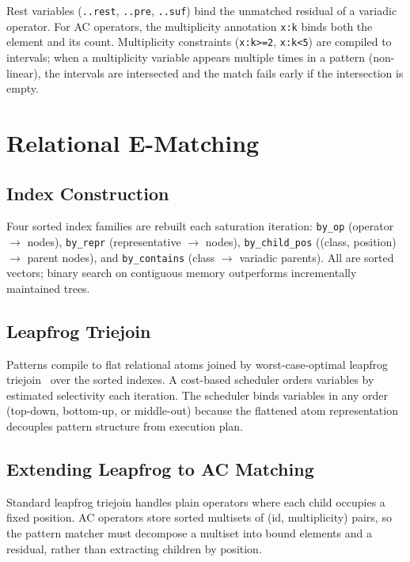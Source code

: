 \documentclass[sigplan,nonacm]{acmart}
\begin{document}
Rest variables (\texttt{..rest}, \texttt{..pre}, \texttt{..suf})
bind the unmatched residual of a variadic operator.  For AC
operators, the multiplicity annotation \texttt{x:k} binds both the
element and its count.  Multiplicity constraints (\texttt{x:k>=2},
\texttt{x:k<5}) are compiled to intervals; when a multiplicity
variable appears multiple times in a pattern (non-linear), the
intervals are intersected and the match fails early if the
intersection is empty.


\section{Relational E-Matching}

\subsection{Index Construction}

Four sorted index families are rebuilt each saturation iteration:
\texttt{by\_op} (operator $\to$ nodes), \texttt{by\_repr}
(representative $\to$ nodes), \texttt{by\_child\_pos} ((class,
position) $\to$ parent nodes), and \texttt{by\_contains} (class
$\to$ variadic parents).  All are sorted vectors; binary search on
contiguous memory outperforms incrementally maintained trees.

\subsection{Leapfrog Triejoin}

Patterns compile to flat relational atoms joined by worst-case-optimal
leapfrog triejoin~\cite{veldhuizen} over the sorted indexes.  A
cost-based scheduler orders variables by estimated selectivity each
iteration.  The scheduler binds variables in any order (top-down,
bottom-up, or middle-out) because the flattened atom representation
decouples pattern structure from execution plan.

\subsection{Extending Leapfrog to AC Matching}

Standard leapfrog triejoin handles plain operators where each child
occupies a fixed position.  AC operators store sorted multisets of
(id, multiplicity) pairs, so the pattern matcher must decompose a
multiset into bound elements and a residual, rather than extracting
children by position.
\end{document}

